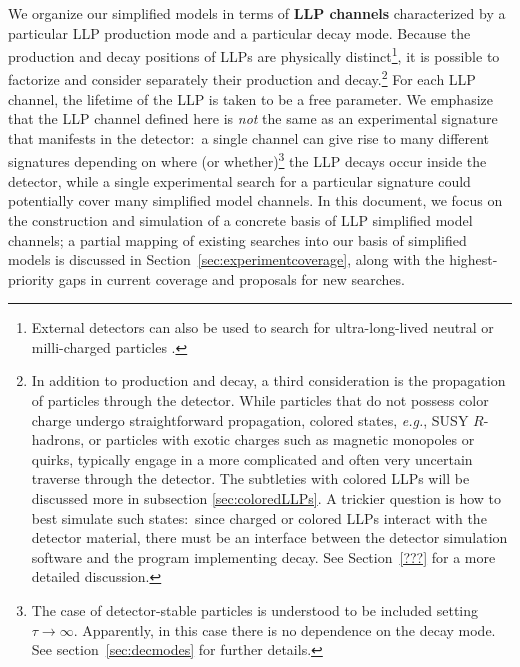 We organize our simplified models in terms of {\bf LLP channels} characterized by a particular LLP production mode and a particular decay mode. Because the production and decay positions of LLPs are physically distinct\footnote{External detectors can also be used to search for ultra-long-lived neutral or milli-charged particles \cite{Haas:2014dda,Chou:2016lxi,Gligorov:2017nwh,Feng:2017uoz}. }, it is possible to factorize and consider separately their production and decay.\footnote{In addition to production and decay, a third consideration is the propagation of particles through the detector.  While particles that do not possess color charge undergo straightforward propagation, colored states, \emph{e.g.}, SUSY $R$-hadrons, or particles with exotic charges such as magnetic monopoles or quirks, typically engage in a more complicated and often very uncertain traverse through the detector.  The subtleties with colored LLPs will be discussed more in subsection \ref{sec:coloredLLPs}. A trickier question is how to best simulate such states:~since charged or colored LLPs interact with the detector material, there must be an interface between the detector simulation software and the program implementing decay. See Section~\ref{???} for a more detailed discussion.} 
For each LLP channel, the lifetime of the LLP is taken to be a free parameter. We emphasize that the LLP channel defined here is \emph{not} the same as an experimental signature that manifests in the detector:~a single channel can give rise to many different signatures depending on where (or whether)\footnote{The case of detector-stable particles is understood to be included setting $\tau\to\infty$. Apparently, in this case there is no dependence on the decay mode.
See section~\ref{sec:decmodes} for further details.} the LLP decays occur inside the detector, while a single experimental search for a particular signature could potentially cover many simplified model channels. In this document, we focus on the construction and simulation of a concrete basis of LLP simplified model channels; a partial mapping of existing searches into our basis of simplified models is discussed in Section~\ref{sec:experimentcoverage}, along with the highest-priority gaps in current coverage and proposals for new searches.

